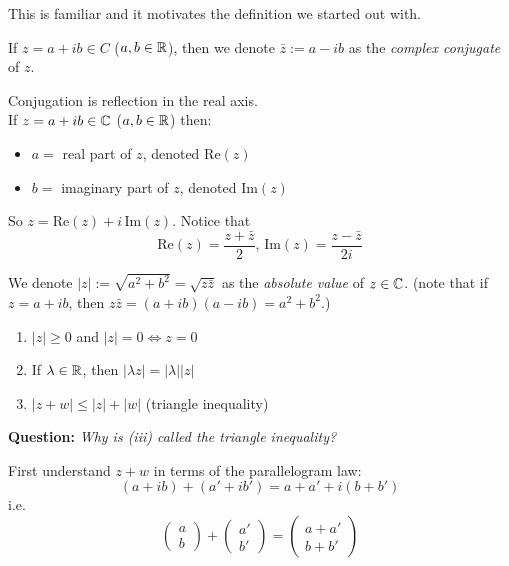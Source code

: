 \documentclass[10pt]{scrartcl}
\begin{document}
This is familiar and it motivates the definition we started out with.


If   $z = a + ib \in C$ ($a,b \in\mathbb{R}$), then we denote $\bar{z} := a-ib$ as the \emph{complex conjugate} of $z$.

\begin{center}
\end{center}

Conjugation is reflection in the real axis.\\

If $z = a + ib \in\mathbb{C}$ ($a,b \in\mathbb{R}$) then: 
\begin{itemize}
\item $a =$ real part of $z$, denoted $\mathrm{Re}(z)$
\item $b = $ imaginary part of $z$, denoted $\mathrm{Im}(z)$	
\end{itemize}\vspace*{5pt}

So $z = \mathrm{Re}(z) + i\,\mathrm{Im}(z)$. Notice that \[\mathrm{Re}(z) = \dfrac{z + \bar{z}}{2},\,
\mathrm{Im}(z) = \dfrac{z-\bar{z}}{2i}\]

We denote $|z|:= \sqrt{a^2 + b^2} = \sqrt{z\bar{z}}$ as the \emph{absolute value} of $z\in\mathbb{C}$. (note that if $z = a +ib$, then $z\bar{z} = (a+ib)(a-ib) = a^2+b^2$.)\\


\begin{enumerate}
\item $|z| \geq 0$ and $|z| = 0 \iff z = 0$
\item If $\lambda \in\mathbb{R}$, then $|\lambda z| = |\lambda||z|$
\item $|z+w| \leq |z| + |w|$ (triangle inequality)	
\end{enumerate}\vsp

\textbf{Question:} \emph{Why is (iii) called the triangle inequality?}

 First understand $z + w$ in terms of the parallelogram law: 
\[(a+ ib) + (a' + ib') = a + a' + i(b + b')\]
i.e. 
\[\begin{pmatrix}
a \\ b	
\end{pmatrix}
+ \begin{pmatrix}
 a' \\ b'	
 \end{pmatrix}
= \begin{pmatrix}
 a + a'\\ b + b'	
 \end{pmatrix}
\]
\end{document}
